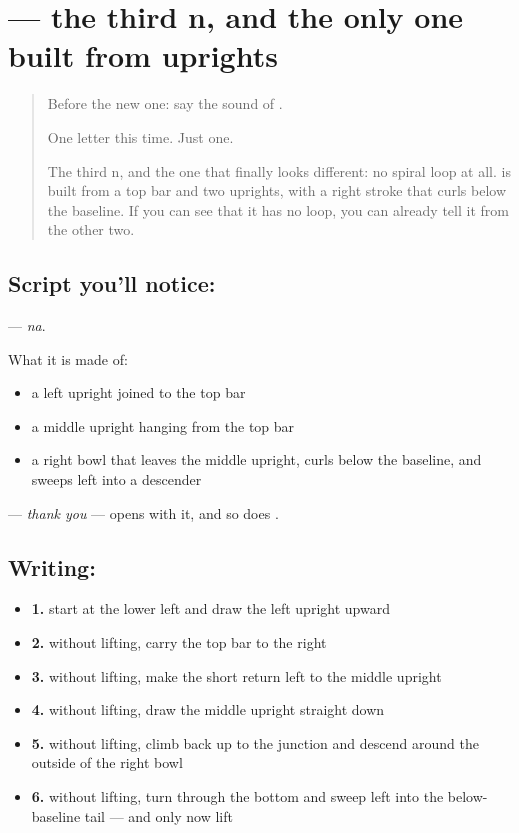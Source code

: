 \section[\texorpdfstring{\ta{ந} (na)}{ந (na)}]{ — the third n, and the only one built from uprights}

\label{lesson:TA-S04-na}



\begin{quote}
Before the new one: say the sound of \textbf{}.

One letter this time. Just one.

The third n, and the one that finally looks different: no spiral loop at all.  is built from a top bar and two uprights, with a right stroke that curls below the baseline. If you can see that it has no loop, you can already tell it from the other two.
\end{quote}

\subsection*{Script you'll notice: }
\textbf{} — \emph{na}.

What it is made of:

\begin{itemize}
\raggedright
  \item a left upright joined to the top bar
  \item a middle upright hanging from the top bar
  \item a right bowl that leaves the middle upright, curls below the baseline, and sweeps left into a descender
\end{itemize}

 — \emph{thank you} — opens with it, and so does .

\subsection*{Writing: }

\begin{itemize}
\raggedright
  \item \textbf{1.} start at the lower left and draw the left upright upward
  \item \textbf{2.} without lifting, carry the top bar to the right
  \item \textbf{3.} without lifting, make the short return left to the middle upright
  \item \textbf{4.} without lifting, draw the middle upright straight down
  \item \textbf{5.} without lifting, climb back up to the junction and descend around the outside of the right bowl
  \item \textbf{6.} without lifting, turn through the bottom and sweep left into the below-baseline tail — and only now lift
\end{itemize}

